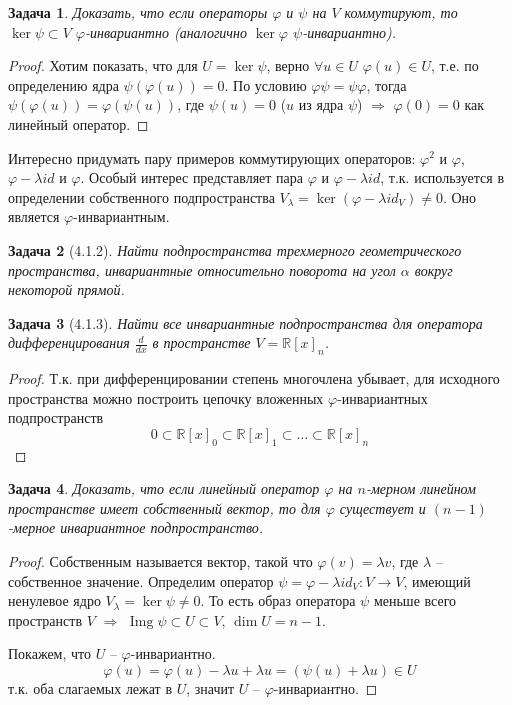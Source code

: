 \documentclass[a4paper,12pt]{article}
\DeclareMathOperator{\img}{\mathop{Img}}
\newtheorem*{prob}{Задача}
\begin{document}
\begin{prob}
	Доказать, что если операторы $\varphi$ и $\psi$ на $V$ коммутируют, то $\ker \psi \subset V$ $\varphi$-инвариантно (аналогично $\ker \varphi$ $\psi$-инвариантно).
\end{prob}
\begin{proof}
	Хотим показать, что для $U = \ker \psi$, верно $\forall u \in U$ $\varphi(u) \in U$, т.е. по определению ядра $\psi(\varphi(u)) = 0$. По условию $\varphi \psi = \psi \varphi$, тогда $\psi(\varphi(u)) = \varphi(\psi(u))$, где $\psi(u) = 0$ ($u$ из ядра $\psi$) $\Rightarrow$ $\varphi(0) = 0$ как линейный оператор.
\end{proof}

Интересно придумать пару примеров коммутирующих операторов: $\varphi^2$ и $\varphi$, $\varphi - \lambda id$ и $\varphi$. Особый интерес представляет пара $\varphi$ и $\varphi - \lambda id$, т.к. используется в определении собственного подпространства $V_\lambda = \ker(\varphi - \lambda id_V) \ne 0$. Оно является $\varphi$-инвариантным.

\begin{prob}[4.1.2]
	Найти подпространства трехмерного геометрического пространства, инвариантные относительно поворота на угол $\alpha$ вокруг некоторой прямой.
\end{prob}

\begin{prob}[4.1.3]
	Найти все инвариантные подпространства для оператора дифференцирования $\frac{d}{dx}$ в пространстве $V = \mathbb{R}[x]_n$.
\end{prob}
\begin{proof}
	Т.к. при дифференцировании степень многочлена убывает, для исходного пространства можно построить цепочку вложенных $\varphi$-инвариантных подпространств 
	\[
		0 \subset \mathbb{R}[x]_0 \subset \mathbb{R}[x]_1 \subset \ldots \subset \mathbb{R}[x]_n
	\]
\end{proof}

\begin{prob}
	Доказать, что если линейный оператор $\varphi$ на $n$-мерном линейном пространстве имеет собственный вектор, то для $\varphi$ существует и $(n-1)$-мерное инвариантное подпространство.
\end{prob}
\begin{proof}
	Собственным называется вектор, такой что $\varphi(v) = \lambda v$, где $\lambda$ -- собственное значение. Определим оператор $\psi = \varphi - \lambda id_V : V \to V$, имеющий ненулевое ядро $V_\lambda = \ker \psi \ne 0$. То есть образ оператора $\psi$ меньше всего пространств $V$ $\Rightarrow$ $\img \psi \subset U \subset V$, $\dim U = n-1$.
	
	Покажем, что $U$ -- $\varphi$-инвариантно. 
	\[
		\varphi(u) = \varphi(u) - \lambda u + \lambda u = (\psi(u) + \lambda u) \in U
	\]
	т.к. оба слагаемых лежат в $U$, значит $U$ -- $\varphi$-инвариантно.
\end{proof}
\end{document}
